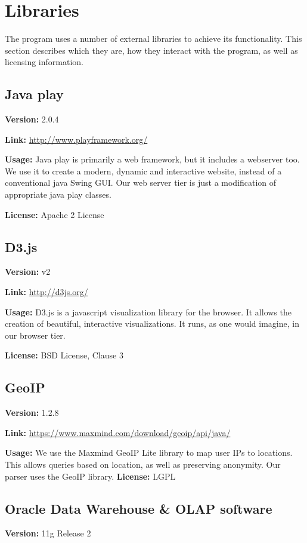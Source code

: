 \section{Libraries}

The program uses a number of external libraries to achieve its functionality. This section describes which they are,
how they interact with the program, as well as licensing information. 

\subsection{Java play}
\textbf{Version:} 2.0.4

\textbf{Link:} \url{http://www.playframework.org/}

\textbf{Usage:} 
Java play is primarily a web framework, but it includes a webserver too.
We use it to create a modern, dynamic and interactive website, instead of a conventional java Swing GUI.
Our web server tier is just a modification of appropriate java play classes.

\textbf{License:} Apache 2 License
\subsection{D3.js}
\textbf{Version:} v2

\textbf{Link:} \url{http://d3js.org/} 

\textbf{Usage:} 
D3.js is a javascript visualization library for the browser.
It allows the creation of beautiful, interactive visualizations.
It runs, as one would imagine, in our browser tier.

\textbf{License:} BSD License, Clause 3


\subsection{GeoIP}\label{geo}

\textbf{Version:} 1.2.8

\textbf{Link:} \url{https://www.maxmind.com/download/geoip/api/java/}

\textbf{Usage:} 
We use the Maxmind GeoIP Lite library to map user IPs to locations.
This allows queries based on location, as well as preserving anonymity.
Our parser uses the GeoIP library.
\textbf{License:} LGPL

\subsection{Oracle Data Warehouse \& OLAP software}
\textbf{Version:} 11g Release 2


